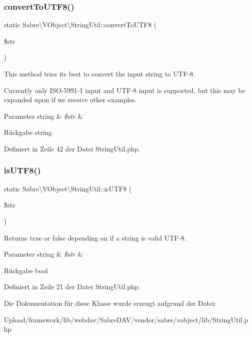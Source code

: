 \subsubsection{\texorpdfstring{convert\+To\+U\+T\+F8()}{convertToUTF8()}}
{\footnotesize\ttfamily static Sabre\textbackslash{}\+V\+Object\textbackslash{}\+String\+Util\+::convert\+To\+U\+T\+F8 (\begin{DoxyParamCaption}\item[{}]{\$str }\end{DoxyParamCaption})\hspace{0.3cm}{\ttfamily [static]}}

This method tries its best to convert the input string to U\+T\+F-\/8.

Currently only I\+S\+O-\/5991-\/1 input and U\+T\+F-\/8 input is supported, but this may be expanded upon if we receive other examples.


\begin{DoxyParams}[1]{Parameter}
string & {\em \$str} & \\
\hline
\end{DoxyParams}
\begin{DoxyReturn}{Rückgabe}
string 
\end{DoxyReturn}


Definiert in Zeile 42 der Datei String\+Util.\+php.

\mbox{\label{class_sabre_1_1_v_object_1_1_string_util_af127bdab773428f41f2b93102ad562a2}} 
\subsubsection{\texorpdfstring{is\+U\+T\+F8()}{isUTF8()}}
{\footnotesize\ttfamily static Sabre\textbackslash{}\+V\+Object\textbackslash{}\+String\+Util\+::is\+U\+T\+F8 (\begin{DoxyParamCaption}\item[{}]{\$str }\end{DoxyParamCaption})\hspace{0.3cm}{\ttfamily [static]}}

Returns true or false depending on if a string is valid U\+T\+F-\/8.


\begin{DoxyParams}[1]{Parameter}
string & {\em \$str} & \\
\hline
\end{DoxyParams}
\begin{DoxyReturn}{Rückgabe}
bool 
\end{DoxyReturn}


Definiert in Zeile 21 der Datei String\+Util.\+php.



Die Dokumentation für diese Klasse wurde erzeugt aufgrund der Datei\+:\begin{DoxyCompactItemize}
\item 
Upload/framework/lib/webdav/\+Sabre\+D\+A\+V/vendor/sabre/vobject/lib/String\+Util.\+php\end{DoxyCompactItemize}
